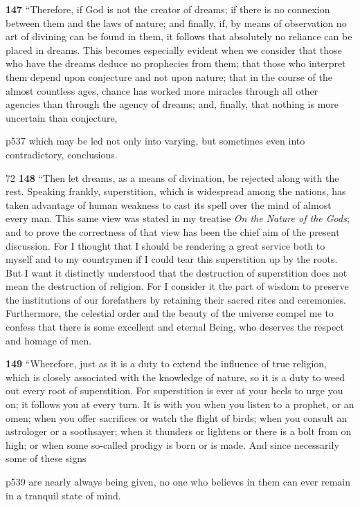 \textbf{147} ``Therefore, if God is not the creator of dreams; if there is no connexion between them and the laws of nature; and finally, if, by means of observation no art of divining can be found in them, it follows that absolutely no reliance can be placed in dreams. This becomes especially evident when we consider that those who have the dreams deduce no prophecies from them; that those who interpret them depend upon conjecture and not upon nature; that in the course of the almost countless ages, chance has worked more miracles through all other agencies than through the agency of dreams; and, finally, that nothing is more uncertain than conjecture,

p537 which may be led not only into varying, but sometimes even into contradictory, conclusions.

72
\textbf{148} ``Then let dreams, as a means of divination, be rejected along with the rest. Speaking frankly, superstition, which is widespread among the nations, has taken advantage of human weakness to cast its spell over the mind of almost every man. This same view was stated in my treatise \emph{On the Nature of the Gods}; and to prove the correctness of that view has been the chief aim of the present discussion. For I thought that I should be rendering a great service both to myself and to my countrymen if I could tear this superstition up by the roots. But I want it distinctly understood that the destruction of superstition does not mean the destruction of religion. For I consider it the part of wisdom to preserve the institutions of our forefathers by retaining their sacred rites and ceremonies. Furthermore, the celestial order and the beauty of the universe compel me to confess that there is some excellent and eternal Being, who deserves the respect and homage of men.

\textbf{149} ``Wherefore, just as it is a duty to extend the influence of true religion, which is closely associated with the knowledge of nature, so it is a duty to weed out every root of superstition. For superstition is ever at your heels to urge you on; it follows you at every turn. It is with you when you listen to a prophet, or an omen; when you offer sacrifices or watch the flight of birds; when you consult an astrologer or a soothsayer; when it thunders or lightens or there is a bolt from on high; or when some so\texthebrew{‑}called prodigy is born or is made. And since necessarily some of these signs

p539 are nearly always being given, no one who believes in them can ever remain in a tranquil state of mind.

